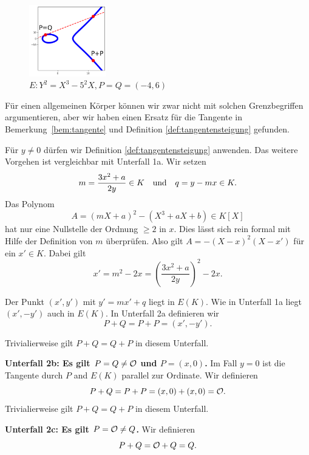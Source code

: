 \begin{figure}
  \centering    
  \caption{$E: Y^2 = X^3-5^2 X,P = Q=(-4,6)$}
  \label{fig:unterfall2a}
  \includegraphics[width=0.3\textwidth]{./plots/unterfall2a.png}
\end{figure}

Für einen allgemeinen Körper können wir zwar nicht mit solchen
Grenzbegriffen argumentieren, aber wir haben einen Ersatz für die
Tangente in Bemerkung~\ref{bem:tangente} und Definition
\ref{def:tangentensteigung}
gefunden.


Für $y\not=0$ dürfen wir  Definition \ref{def:tangentensteigung}
anwenden. Das weitere Vorgehen ist vergleichbar mit Unterfall 1a.
Wir setzen
$$m =  \frac{3x^2+a}{2y}\in K\quad\text{und}\quad q = y-mx\in K.$$
Das Polynom
$$
A = (mX+a)^2 - (X^3+aX+b) \in K[X]
$$
hat nur eine Nullstelle der Ordnung $\ge 2$ in $x$. Dies lässt sich
rein formal mit Hilfe der Definition von $m$ überprüfen.
Also gilt $A = -(X-x)^2(X-x')$ für ein $x'\in K$. Dabei gilt
\begin{equation*}
  x' = m^2 - 2x = \left(\frac{3x^2+a}{2y}\right)^2 - 2x. 
\end{equation*}

Der Punkt $(x',y')$ mit $y'=mx'+q$ liegt in $E(K)$. Wie in Unterfall
1a liegt $(x',-y')$ auch in $E(K)$. 
In Unterfall 2a
definieren wir
\begin{equation*}
  P+Q = P+P = \left(x',-y'\right).
\end{equation*}

Trivialierweise gilt $P+Q=Q+P$ in diesem Unterfall.

\textbf{Unterfall 2b: Es gilt $P=Q\not={\mathcal O}$ und $P=(x,0)$.}
Im Fall $y=0$ ist die Tangente durch $P$ and $E(K)$ parallel zur
Ordinate. Wir 
definieren
\begin{equation*}
  P+Q = P+P = (x,0)+(x,0) = {\mathcal O}. 
\end{equation*}
Trivialierweise gilt $P+Q=Q+P$ in diesem Unterfall.

\textbf{Unterfall 2c: Es gilt $P={\mathcal O}\not=Q$.}
Wir definieren 
\begin{equation*}
  P+Q = {\mathcal O} + Q = Q. 
\end{equation*}


